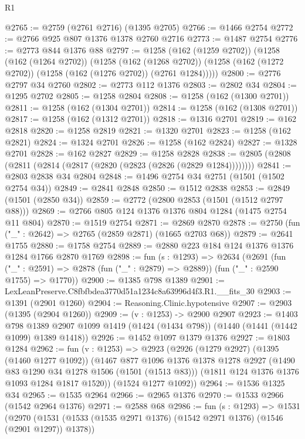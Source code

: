 \begin{lexlean}{R1}
\begin{coremodule}
@2765 := @2759 (@2761 @2716) (@1395 @2705)
@2766 := @1466 @2754
@2772 := @2766 @925 @807 @1376 @1378 @2760 @2716
@2773 := @1487 @2754
@2776 := @2773 @844 @1376 @88
@2797 := @1258
    (@162 (@1259 @2702))
    (@1258
      (@162 (@1264 @2702))
      (@1258
        (@162 (@1268 @2702))
        (@1258 (@162 (@1272 @2702)) (@1258 (@162 (@1276 @2702)) (@2761 @1284)))))
@2800 := @2776 @2797 @34 @2760
@2802 := @2773 @112 @1376
@2803 := @2802 @34
@2804 := @1295 @2702
@2805 := @1258 @2804
@2808 := @1258 (@162 (@1300 @2701))
@2811 := @1258 (@162 (@1304 @2701))
@2814 := @1258 (@162 (@1308 @2701))
@2817 := @1258 (@162 (@1312 @2701))
@2818 := @1316 @2701
@2819 := @162 @2818
@2820 := @1258 @2819
@2821 := @1320 @2701
@2823 := @1258 (@162 @2821)
@2824 := @1324 @2701
@2826 := @1258 (@162 @2824)
@2827 := @1328 @2701
@2828 := @162 @2827
@2829 := @1258 @2828
@2838 := @2805 (@2808 (@2811 (@2814 (@2817 (@2820 (@2823 (@2826 (@2829 @1284))))))))
@2841 := @2803 @2838 @34 @2804
@2848 := @1496 @2754 @34 @2751 (@1501 (@1502 @2754 @34))
@2849 := @2841 @2848
@2850 := @1512 @2838
@2853 := @2849 (@1501 (@2850 @34))
@2859 := @2772 (@2800 @2853 (@1501 (@1512 @2797 @88)))
@2869 := @2766 @805 @124 @1376 @1376 @804 @1284 (@1475 @2754 @11 @804)
@2870 := @1519 @2754
@2871 := @2869 @2870
@2878 := @2750 (fun ("_" : @2642) => @2765 (@2859 @2871) (@1665 @2703 @68))
@2879 := @2641 @1755
@2880 := @1758 @2754
@2889 := @2880 @223 @184 @124 @1376 @1376 @1284 @1766 @2870 @1769
@2898 := fun (s : @1293) =>
  @2634
    (@2691
      (fun ("_" : @2591) => @2878 (fun ("_" : @2879) => @2889))
      (fun ("_" : @2590 @1755) => @1770))
@2900 := @1385 @798 @1389
@2901 := LexLeanPreserve.C8fbfbdea3770d51a1234c8a63996d4f3.R1.__fits_30
@2903 := @1391 (@2901 @1260)
@2904 := Reasoning.Clinic.hypotensive
@2907 := @2903 (@1395 (@2904 @1260))
@2909 := (v : @1253) -> @2900 @2907
@2923 := @1403
    @798
    @1389
    @2907
    @1099
    @1419
    (@1424 (@1434 @798))
    (@1440 (@1441 (@1442 @1099) @1389 @1418))
@2926 := @1452 @1097 @1379 @1376
@2927 := @1803 @1284
@2962 := fun (v : @1253) =>
  @2923
    (@2926
      (@1279 @2927)
      (@1395 (@1460 @1277 @1092))
      (@1467
        @877
        @1096
        @1376
        @1378
        @1278
        @2927
        (@1490 @83 @1290 @34 @1278 @1506 (@1501 (@1513 @83)))
        (@1811 @124 @1376 @1376 @1093 @1284 @1817 @1520))
      (@1524 @1277 @1092))
@2964 := @1536 @1325 @34
@2965 := @1535 @2964
@2966 := @2965 @1376
@2970 := @1533 @2966 (@1542 @2964 @1376)
@2971 := @2588 @68
@2986 := fun (s : @1293) =>
  @1531
    (@2970
      (@1531 (@1533 (@1535 @2971 @1376) (@1542 @2971 @1376) (@1546 (@2901 @1297)) @1378))

\end{coremodule}
\end{lexlean}
